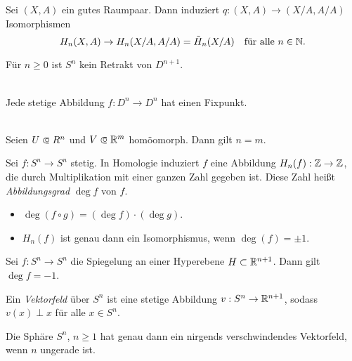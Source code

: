 \documentclass{cheat-sheet}
\newcommand{\RH}{\tilde{H}} %
\begin{document}
\begin{prop}
  Sei $(X, A)$ ein gutes Raumpaar. Dann induziert $q : (X, A) \to (X/A, A/A)$ Isomorphismen
  \[ H_n(X, A) \to H_n(X/A, A/A) = \RH_n(X/A) \quad \text{für alle $n \in \N$.} \]
\end{prop}

\begin{satz}
  Für $n \geq 0$ ist $S^n$ kein Retrakt von $D^{n+1}$.
\end{satz}

\begin{kor}\mbox{}\\
  Jede stetige Abbildung $f : D^n \to D^n$ hat einen Fixpunkt.
\end{kor}

\begin{satz}\mbox{}\\
  Seien $U \opn R^n$ und $V \opn \R^m$ homöomorph. Dann gilt $n = m$.
\end{satz}


\begin{defn}
  Sei $f : S^n \to S^n$ stetig. In Homologie induziert $f$ eine Abbildung $H_n(f) : \mathbb{Z} \to \mathbb{Z}$, die durch Multiplikation mit einer ganzen Zahl gegeben ist. Diese Zahl heißt \emph{Abbildungsgrad} $\deg f$ von $f$.
\end{defn}

\begin{lem}
  \begin{itemize}
    \item $\deg (f \circ g) = (\deg f) \cdot (\deg g)$.
    \item $H_n(f)$ ist genau dann ein Isomorphismus, wenn $\deg(f) = \pm 1$.
  \end{itemize}
\end{lem}

\begin{prop}
  Sei $f : S^n \to S^n$ die Spiegelung an einer Hyperebene $H \subset \mathbb{R}^{n+1}$. Dann gilt $\deg f = -1$.
\end{prop}

\begin{defn}
  Ein \emph{Vektorfeld} über $S^n$ ist eine stetige Abbildung $v : S^n \to \mathbb{R}^{n+1}$, sodass $v(x) \perp x$ für alle $x \in S^n$.
\end{defn}

\begin{satz}
  Die Sphäre $S^n$, $n \geq 1$ hat genau dann ein nirgends verschwindendes Vektorfeld, wenn $n$ ungerade ist.
\end{satz}
\end{document}
